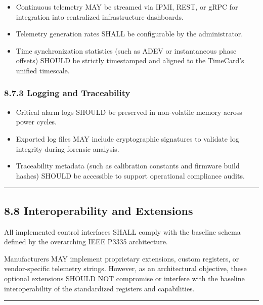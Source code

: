 \documentclass[
]{article}
\begin{document}
\begin{itemize}
\item
  Continuous telemetry MAY be streamed via IPMI, REST, or gRPC for
  integration into centralized infrastructure dashboards.
\item
  Telemetry generation rates SHALL be configurable by the administrator.
\item
  Time synchronization statistics (such as ADEV or instantaneous phase
  offsets) SHOULD be strictly timestamped and aligned to the TimeCard's
  unified timescale.
\end{itemize}

\subsubsection{8.7.3 Logging and
Traceability}\label{logging-and-traceability}

\begin{itemize}
\item
  Critical alarm logs SHOULD be preserved in non-volatile memory across
  power cycles.
\item
  Exported log files MAY include cryptographic signatures to validate
  log integrity during forensic analysis.
\item
  Traceability metadata (such as calibration constants and firmware
  build hashes) SHOULD be accessible to support operational compliance
  audits.
\end{itemize}

\begin{center}\rule{0.5\linewidth}{0.5pt}\end{center}

\subsection{8.8 Interoperability and
Extensions}\label{interoperability-and-extensions}

All implemented control interfaces SHALL comply with the baseline schema
defined by the overarching IEEE P3335 architecture.

Manufacturers MAY implement proprietary extensions, custom registers, or
vendor-specific telemetry strings. However, as an architectural
objective, these optional extensions SHOULD NOT compromise or interfere
with the baseline interoperability of the standardized registers and
capabilities.

\begin{center}\rule{0.5\linewidth}{0.5pt}\end{center}
\end{document}
